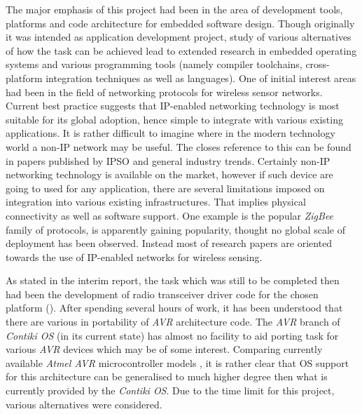 
  The major emphasis of this project had been in the area of development
 tools, platforms and code architecture for embedded software design.
 Though originally it was intended as application development project,
 study of various alternatives of how the task can be achieved lead to
 extended research in embedded operating systems and various programming
 tools (namely compiler toolchains, cross-platform integration techniques
 as well as languages).
  One of initial interest areas had been in the field of networking protocols
 for wireless sensor networks. Current best practice suggests that IP-enabled
 networking technology is most suitable for its global adoption, hence simple
 to integrate with various existing applications. It is rather difficult to
 imagine where in the modern technology world a non-IP network may be useful.%
 The closes reference to this can be found in papers published by IPSO 
 \cite{IPSO_PAPERS} and general industry trends. Certainly non-IP networking
 technology is available on the market, however if such device are going to
 used for any application, there are several limitations imposed on integration
 into various existing infrastructures. That implies physical connectivity
 as well as software support. One example is the popular \emph{ZigBee}
 family of protocols, is apparently gaining popularity, thought no global
 scale of deployment has been observed. Instead most of research papers
 are oriented towards the use of IP-enabled networks for wireless sensing.


  As stated in the interim report, the task which was still to be
 completed then had been the development of radio transceiver driver
 code for the chosen platform (). After spending
 several hours of work, it has been understood that there are various
 in portability of \emph{AVR} architecture code. The \emph{AVR} branch
 of \emph{Contiki OS} (in its current state) has almost no facility to
 aid porting task for various \emph{AVR} devices which may be of some
 interest. Comparing currently available \emph{Atmel AVR} microcontroller
 models \cite{atmel:avr:table}, it is rather clear that OS support for
 this architecture can be generalised to much higher degree then what is
 currently provided by the \emph{Contiki OS}. Due to the time limit for
 this project, various alternatives were considered.



